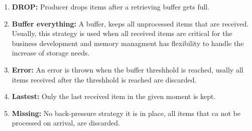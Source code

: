 	\begin{enumerate}
		\item \textbf{DROP:} Producer drops items after a retrieving buffer gets full.
		\item \textbf{Buffer everything:} A buffer, keeps all unprocessed items that are received. Usually, this strategy is used when all received items are critical for the business development and memory managment has flexibility to handle the increase of storage needs.
		\item \textbf{Error:} An error is thrown when the buffer threshhold is reached, usally all items received after the threshhold is reached are discarded.
		\item \textbf{Lastest:} Only the last received item in the given moment is kept.
		\item \textbf{Missing:} No back-pressure strategy it is in place, all items that ca not be processed on arrival, are discarded.
	\end{enumerate}
	\clearpage
